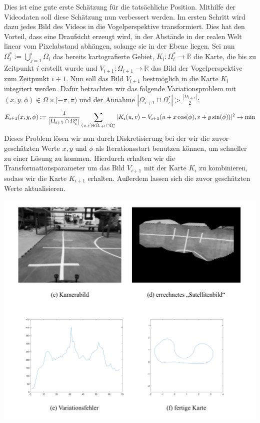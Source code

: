 Dies ist eine gute erste Schätzung für die tatsächliche Position. Mithilfe der Videodaten soll diese Schätzung nun verbessert werden. Im ersten Schritt wird dazu jedes Bild des Videos in die Vogelperspektive transformiert. Dies hat den Vorteil, dass eine Draufsicht erzeugt wird, in der Abstände in der realen Welt linear vom Pixelabstand abhängen, solange sie in der Ebene liegen. Sei nun 
$\Omega^*_{i}:=\bigcup_{j=1}^i\Omega_i$ das bereits kartografierte Gebiet,
$K_i:\Omega^*_{i} \rightarrow \mathbb{R}$ die Karte, die bis zu Zeitpunkt $i$ erstellt wurde und $V_{i+1}:\Omega_{i+1}\rightarrow \mathbb{R}$ das Bild der Vogelperspektive zum Zeitpunkt $i+1$. Nun soll das Bild $V_{i+1}$ bestmöglich in die Karte $K_i$ integriert werden. Dafür betrachten wir das folgende Variationsproblem mit $(x,y,\phi)\in \Omega \times [-\pi,\pi)$ und der Annahme $|\Omega_{i+1}\cap \Omega^*_i|>\frac{|\Omega_{i+1}|}{2}$:
$$E_{i+1}(x,y,\phi):= \frac{1}{|\Omega_{i+1}\cap \Omega^*_{i}|}\sum_{(u,v) \in \Omega_{i+1}\cap \Omega^*_{i}} |K_{i}(u,v)-V_{i+1}(u+x\cos(\phi),v+y\sin(\phi))|^2 \rightarrow \textnormal{min} $$
Dieses Problem lösen wir nun durch Diskretisierung bei der wir die zuvor geschätzten Werte $x,y$ und $\phi$ als Iterationsstart benutzen können, um schneller zu einer Lösung zu kommen. Hierdurch erhalten wir die Transformationsparameter um das Bild $V_{i+1}$ mit der Karte $K_i$ zu kombinieren, sodass wir die Karte $K_{i+1}$ erhalten. Außerdem lassen sich die zuvor geschätzten Werte aktualisieren.


\hspace{-10mm}
\includegraphics[scale=1]{3456.png}



